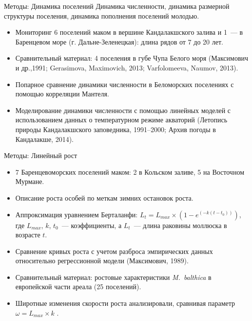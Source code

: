 \documentclass{beamer}
\begin{document}
\begin{frame}{Методы: Динамика поселений}
Динамика численности, динамика размерной структуры поселения, динамика пополнения поселений молодью.
	\begin{itemize}
		\item Мониторинг 6 поселений маком в вершине Кандалакшского залива и 1~--- в Баренцевом море (г. Дальне-Зеленецкая): длина рядов от 7 до 20 лет.
		\item Сравнительный материал: 4 поселения в губе Чупа Белого моря (Максимович и др.,1991; Gerasimova, Maximovich, 2013; Varfolomeeva, Naumov, 2013).
		\item Попарное сравнение динамики численности в Беломорских поселениях с помощью корреляции Мантеля.
		\item Моделирование динамики численности с помощью линейных моделей с использованием данных о температурном режиме акваторий (Летопись природы 	Кандалакшского заповедника, 1991–2000; Архив погоды в Кандалакше, 2014).
	\end{itemize}
\end{frame}

\begin{frame}{Методы: Линейный рост}
	\begin{itemize}
		\item 7 Баренцевоморских поселений маком: 2 в Кольском заливе, 5 на Восточном Мурмане.
		\item Описание роста особей по меткам зимних остановок роста.
		\item Аппроксимация уравнением Берталанфи: $L_{t} = L_{max} \times (1 - e^{(-k(t - t_{0}))})$, где $L_{max}$, $k$, $t_{0}$~--- коэффициенты, а $L_{t}$~--- длина раковины моллюска в возрасте $t$.
		\item Сравнение кривых роста с учетом разброса эмпирических данных относительно регрессионной модели (Максимович, 1989).
		\item Сравнительный материал: ростовые характеристики {\it M.~balthica} в европейской части ареала (25 поселений).
		\item Широтные изменения скорости роста анализировали, сравнивая параметр $\omega = L_{max} \times k$ .
	\end{itemize}
\end{frame}




\end{document}
